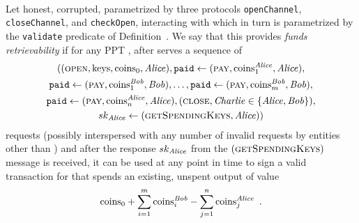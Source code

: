\begin{definition} \ \\
  \label{def:retrievability}
  Let \alice{} honest, \bob{} corrupted, \chanfunc{} parametrized by three
  protocols \texttt{openChannel}, \texttt{closeChannel}, and \texttt{checkOpen},
  interacting with \ledger{} which in turn is parametrized by the
  \texttt{validate} predicate of Definition~\TODO{}. We say that this
  \chanfunc{} provides {\em funds retrievability} if for any PPT \adversary,
  after \chanfunc{} serves a sequence of
  \begin{gather*}
    ((\textsc{open}, \mathrm{keys}, \mathrm{coins}_0, \mathit{Alice}), \mathtt{paid}
    \gets (\textsc{pay}, \mathrm{coins}_1^{\mathit{Alice}}, \mathit{Alice}), \\
    \mathtt{paid} \gets (\textsc{pay}, \mathrm{coins}_1^{\mathit{Bob}}, \mathit{Bob}), \dots,
    \mathtt{paid} \gets (\textsc{pay}, \mathrm{coins}_m^{\mathit{Bob}}, \mathit{Bob}), \\
    \mathtt{paid} \gets (\textsc{pay}, \mathrm{coins}_n^{\mathit{Alice}}, \mathit{Alice}),
    (\textsc{close}, \mathit{Charlie} \in \{\mathit{Alice}, \mathit{Bob}\}), \\
    sk_{\mathit{Alice}} \gets (\textsc{getSpendingKeys}, \mathit{Alice}))
  \end{gather*}
  requests (possibly interspersed with any number of invalid requests by
  entities other than \alice) and after the response $sk_{\mathit{Alice}}$ from the
  $(\textsc{getSpendingKeys})$ message is received, it can be used at any point
  in time to sign a valid transaction for \ledger{} that spends an existing,
  unspent output of value
  \begin{equation*}
    \mathrm{coins}_0 + \sum\limits_{i=1}^m\mathrm{coins}_i^{\mathit{Bob}} -
    \sum\limits_{j=1}^n\mathrm{coins}_j^{\mathit{Alice}} \enspace.
  \end{equation*}
\end{definition}
